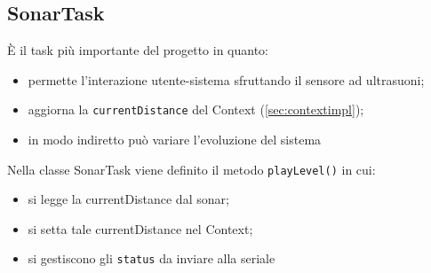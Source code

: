 \subsection{SonarTask}
È il task più importante del progetto in quanto:
\begin{itemize}
	\item permette l'interazione utente-sistema sfruttando il sensore ad ultrasuoni;
	\item aggiorna la \texttt{currentDistance} del Context (\ref{sec:contextimpl});
	\item in modo indiretto può variare l'evoluzione del sistema
\end{itemize}
Nella classe SonarTask viene definito il metodo \texttt{playLevel()} in cui:
\begin{itemize}
	\item si legge la currentDistance dal sonar;
	\item si setta tale currentDistance nel Context;
	\item si gestiscono gli \texttt{status} da inviare alla seriale
\end{itemize}

